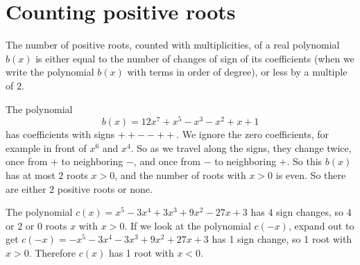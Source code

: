 \section{Counting positive roots}
\begin{theorem}[Descartes]
The number of positive roots, counted with multiplicities, of a real polynomial \(b(x)\) is either equal to the number of changes of sign of its coefficients (when we write the polynomial \(b(x)\) with terms in order of degree), or less by a multiple of \(2\).
\end{theorem}
\begin{example}
The polynomial
\[
b(x)=12x^7+x^5-x^3-x^2+x+1
\]
has coefficients with signs \(++--++\).
We ignore the zero coefficients, for example in front of \(x^6\) and \(x^4\).
So as we travel along the signs, they change twice, once from \(+\) to neighboring \(-\), and once from \(-\) to neighboring \(+\).
So this \(b(x)\) has at most \(2\) roots \(x>0\), and the number of roots with \(x>0\) is even.
So there are either \(2\) positive roots or none.
\end{example}
\begin{example}
The polynomial \(c(x)=x^5-3x^4+3x^3+9x^2-27x+3\) has \(4\) sign changes, so \(4\) or \(2\) or \(0\) roots \(x\) with \(x>0\).
If we look at the polynomial \(c(-x)\), expand out to get \(c(-x)=-x^5-3x^4-3x^3+9x^2+27x+3\) has 1 sign change, so 1 root with \(x>0\).
Therefore \(c(x)\) has 1 root with \(x < 0\).
\end{example}
